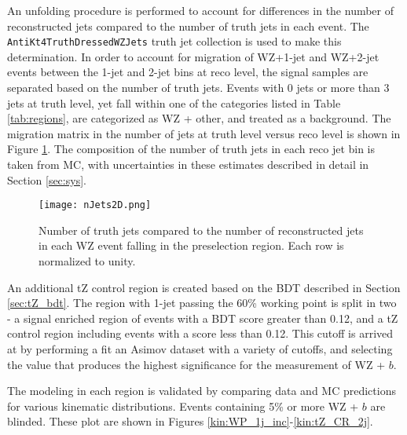 An unfolding procedure is performed to account for differences in the number of reconstructed jets compared to the number of truth jets in each event. The \verb!AntiKt4TruthDressedWZJets! truth jet collection is used to make this determination. In order to account for migration of WZ+1-jet and WZ+2-jet events between the 1-jet and 2-jet bins at reco level, the signal samples are separated based on the number of truth jets. Events with 0 jets or more than 3 jets at truth level, yet fall within one of the categories listed in Table \ref{tab:regions}, are categorized as WZ + other, and treated as a background. The migration matrix in the number of jets at truth level versus reco level is shown in Figure \ref{fig:migrationMat}. The composition of the number of truth jets in each reco jet bin is taken from MC, with uncertainties in these estimates described in detail in Section \ref{sec:sys}. 

\begin{figure}[H]
\center
\texttt{[image: nJets2D.png]}
\caption{Number of truth jets compared to the number of reconstructed jets in each WZ event falling in the preselection region. Each row is normalized to unity.} 
\label{fig:migrationMat}
\end{figure}

An additional tZ control region is created based on the BDT described in Section \ref{sec:tZ_bdt}. The region with 1-jet passing the 60\% working point is split in two - a signal enriched region of events with a BDT score greater than 0.12, and a tZ control region including events with a score less than 0.12. This cutoff is arrived at by performing a fit an Asimov dataset with a variety of cutoffs, and selecting the value that produces the highest significance for the measurement of WZ + $b$.

The modeling in each region is validated by comparing data and MC predictions for various kinematic distributions. Events containing 5\% or more WZ + $b$ are blinded. These plot are shown in Figures \ref{kin:WP_1j_inc}-\ref{kin:tZ_CR_2j}.



